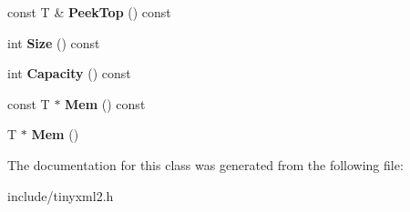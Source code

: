 \begin{DoxyCompactItemize}
\item 
\hypertarget{classtinyxml2_1_1_dyn_array_a9c2282ea8901b5a92ccaac2e6166a788}{}const T \& {\bfseries Peek\+Top} () const \label{classtinyxml2_1_1_dyn_array_a9c2282ea8901b5a92ccaac2e6166a788}

\item 
\hypertarget{classtinyxml2_1_1_dyn_array_a1299b257b62ea6b4983c488867f219b0}{}int {\bfseries Size} () const \label{classtinyxml2_1_1_dyn_array_a1299b257b62ea6b4983c488867f219b0}

\item 
\hypertarget{classtinyxml2_1_1_dyn_array_a8edbe90ed53b2e46b1b5cf53b261e4e7}{}int {\bfseries Capacity} () const \label{classtinyxml2_1_1_dyn_array_a8edbe90ed53b2e46b1b5cf53b261e4e7}

\item 
\hypertarget{classtinyxml2_1_1_dyn_array_a1f39330daeb97d3d1dc3fc12dcf7ac67}{}const T $\ast$ {\bfseries Mem} () const \label{classtinyxml2_1_1_dyn_array_a1f39330daeb97d3d1dc3fc12dcf7ac67}

\item 
\hypertarget{classtinyxml2_1_1_dyn_array_a0e0d60b399d54fad5b33d5008bc59c8e}{}T $\ast$ {\bfseries Mem} ()\label{classtinyxml2_1_1_dyn_array_a0e0d60b399d54fad5b33d5008bc59c8e}

\end{DoxyCompactItemize}


The documentation for this class was generated from the following file\+:\begin{DoxyCompactItemize}
\item 
include/tinyxml2.\+h\end{DoxyCompactItemize}
